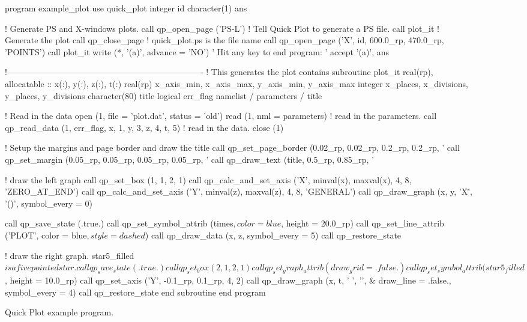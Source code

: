 \begin{figure}
\footnotesize
\begin{listing}{1}
  program example_plot
    use quick_plot
    integer id
    character(1) ans
  
  ! Generate PS and X-windows plots.
    call qp_open_page ('PS-L')  ! Tell Quick Plot to generate a PS file.
    call plot_it              ! Generate the plot
    call qp_close_page        ! quick_plot.ps is the file name
    call qp_open_page ('X', id, 600.0_rp, 470.0_rp, 'POINTS')
    call plot_it
    write (*, '(a)', advance = 'NO') ' Hit any key to end program: '
    accept '(a)', ans

  !----------------------------------------------------------------------
  ! This generates the plot
  contains
  subroutine plot_it
    real(rp), allocatable :: x(:), y(:), z(:), t(:)
    real(rp) x_axis_min, x_axis_max, y_axis_min, y_axis_max
    integer x_places, x_divisions, y_places, y_divisions
    character(80) title
    logical err_flag
    namelist / parameters / title

  ! Read in the data
    open (1, file = 'plot.dat', status = 'old')
    read (1, nml = parameters)                  ! read in the parameters.
    call qp_read_data (1, err_flag, x, 1, y, 3, z, 4, t, 5) ! read in the data.
    close (1)

  ! Setup the margins and page border and draw the title
    call qp_set_page_border (0.02_rp, 0.02_rp, 0.2_rp, 0.2_rp, '%
    call qp_set_margin (0.05_rp, 0.05_rp, 0.05_rp, 0.05_rp, '%
    call qp_draw_text (title, 0.5_rp, 0.85_rp, '%

  ! draw the left graph
    call qp_set_box (1, 1, 2, 1)
    call qp_calc_and_set_axis ('X', minval(x), maxval(x), 4, 8, 'ZERO_AT_END')
    call qp_calc_and_set_axis ('Y', minval(z), maxval(z), 4, 8, 'GENERAL')
    call qp_draw_graph (x, y, 'X\dlab\u', '\gb(\A)', symbol_every = 0)

    call qp_save_state (.true.)
    call qp_set_symbol_attrib (times$, color = blue$, height = 20.0_rp)
    call qp_set_line_attrib ('PLOT', color = blue$, style = dashed$)
    call qp_draw_data (x, z, symbol_every = 5)
    call qp_restore_state

  ! draw the right graph. star5_filled$ is a five pointed star.
    call qp_save_state (.true.)
    call qp_set_box (2, 1, 2, 1)
    call qp_set_graph_attrib (draw_grid = .false.)
    call qp_set_symbol_attrib (star5_filled$, height = 10.0_rp)
    call qp_set_axis ('Y', -0.1_rp, 0.1_rp, 4, 2)
    call qp_draw_graph (x, t, '      ', '\fsLY\fn', &
                                    draw_line = .false., symbol_every = 4)
    call qp_restore_state
  end subroutine
  end program
\end{listing}
\caption{Quick Plot example program.}
\label{f:plot_example}
\end{figure}



